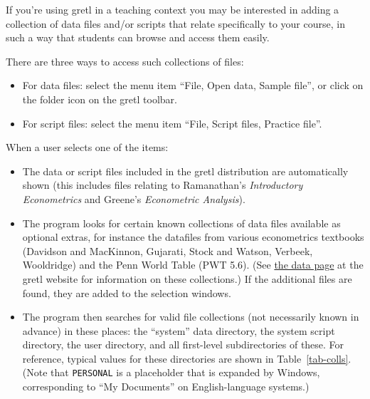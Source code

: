 If you're using gretl in a teaching context you may be
interested in adding a collection of data files and/or scripts that
relate specifically to your course, in such a way that students can
browse and access them easily.

There are three ways to access such collections of files:

\begin{itemize}
\item For data files: select the menu item ``File, Open data, Sample
  file'', or click on the folder icon on the gretl toolbar.
\item For script files: select the menu item ``File, Script
  files, Practice file''.
\end{itemize}

When a user selects one of the items:

\begin{itemize}
\item The data or script files included in the gretl distribution are
  automatically shown (this includes files relating to Ramanathan's
  \emph{Introductory Econometrics} and Greene's \emph{Econometric
    Analysis}).
\item The program looks for certain known collections of data files
  available as optional extras, for instance the datafiles from
  various econometrics textbooks (Davidson and MacKinnon, Gujarati,
  Stock and Watson, Verbeek, Wooldridge) and the Penn World Table (PWT
  5.6).  (See \href{http://gretl.sourceforge.net/gretl_data.html}{the
    data page} at the gretl website for information on these
  collections.)  If the additional files are found, they are added to
  the selection windows.
\item The program then searches for valid file collections (not
  necessarily known in advance) in these places: the ``system'' data
  directory, the system script directory, the user directory, and all
  first-level subdirectories of these.  For reference, typical values
  for these directories are shown in Table~\ref{tab-colls}.  (Note that
  \texttt{PERSONAL} is a placeholder that is expanded by Windows,
  corresponding to ``My Documents'' on English-language systems.)
\end{itemize}


